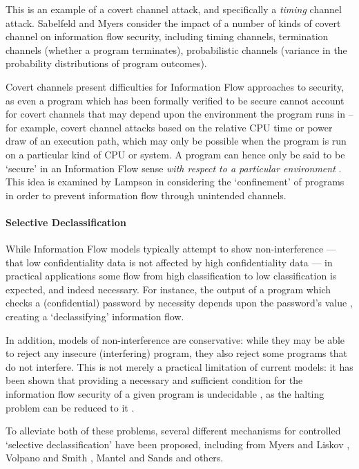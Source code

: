 	This is an example of a covert channel attack, and specifically a \textit{timing} channel attack. Sabelfeld and Myers \cite{sabelfeld2003if} consider the impact of a number of kinds of covert channel on information flow security, including timing channels, termination channels (whether a program terminates), probabilistic channels (variance in the probability distributions of program outcomes).
	
	Covert channels present difficulties for Information Flow approaches to security, as even a program which has been formally verified to be secure cannot account for covert channels that may depend upon the environment the program runs in -- for example, covert channel attacks based on the relative CPU time or power draw of an execution path, which may only be possible when the program is run on a particular kind of CPU or system. A program can hence only be said to be `secure' in an Information Flow sense \textit{with respect to a particular environment} \cite{sabelfeld2003if}. This idea is examined by Lampson \cite{lampson1973covertchannels} in considering the `confinement' of programs in order to prevent information flow through unintended channels.	
	
	\paragraph{Selective Declassification}
	
	While Information Flow models typically attempt to show non-interference --- that low confidentiality data is not affected by high confidentiality data --- in practical applications some flow from high classification to low classification is expected, and indeed necessary. For instance, the output of a program which checks a (confidential) password by necessity depends upon the password's value \cite{sabelfeld2003if}, creating a `declassifying' information flow.
	
	In addition, models of non-interference are conservative: while they may be able to reject any insecure (interfering) program, they also reject some programs that do not interfere. This is not merely a practical limitation of current models: it has been shown that providing a necessary and sufficient condition for the information flow security of a given program is undecidable \cite{landi1992undecidability}, as the halting problem can be reduced to it \cite{denning1977if}.
	
	To alleviate both of these problems, several different mechanisms for controlled `selective declassification' have been proposed, including from Myers and Liskov \cite{myers1997if}, Volpano and Smith \cite{volpano2000declassification}, Mantel and Sands \cite{mantel2004controlled} and others.
	
